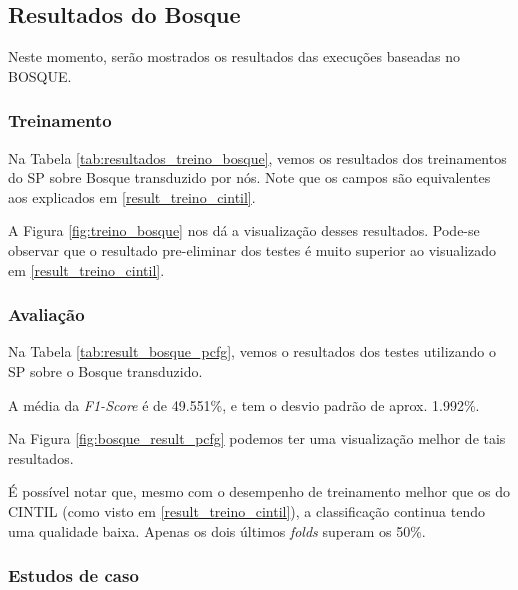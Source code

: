 \subsection{Resultados do Bosque}
\label{resultados_bosque}
Neste momento, serão mostrados os resultados das execuções baseadas no BOSQUE.

\subsubsection{Treinamento} \label{result_treino_bosque}
Na Tabela \ref{tab:resultados_treino_bosque}, vemos os resultados dos treinamentos do SP sobre Bosque transduzido por nós. Note que os campos são equivalentes aos explicados em \ref{result_treino_cintil}.
\begin{center}
    
\end{center}

A Figura \ref{fig:treino_bosque} nos dá a visualização desses resultados. Pode-se observar que o resultado pre-eliminar dos testes é muito superior ao visualizado em \ref{result_treino_cintil}.
\begin{center}
    
\end{center}

\subsubsection{Avaliação} \label{result_aval_bosque}
Na Tabela \ref{tab:result_bosque_pcfg}, vemos o resultados dos testes utilizando o SP sobre o Bosque transduzido.
\begin{center}
    
\end{center}

A média da \textit{F1-Score} é de 49.551\%, e tem o desvio padrão de aprox. 1.992\%.

Na Figura \ref{fig:bosque_result_pcfg} podemos ter uma visualização melhor de tais resultados.
\begin{center}
    
\end{center}

É possível notar que, mesmo com o desempenho de treinamento melhor que os do CINTIL (como visto em \ref{result_treino_cintil}), a classificação continua tendo uma qualidade baixa. 
Apenas os dois últimos \textit{folds} superam os 50\%.

\subsubsection{Estudos de caso}
\label{subsec:ec-bosque}

